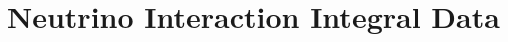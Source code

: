 \documentclass[12pt]{uh_thesis}
\begin{document}
\tableofcontents
\listoffigures
\listoftables
\printnomenclature

\mainmatter













\printbibliography[heading=bibintoc]

\appendix

\chapter{Neutrino Interaction Integral Data}~\label{app:integral_data}



\printindex
\end{document}
